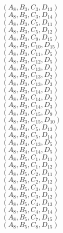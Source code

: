 \documentclass[14pt]{article}
\begin{document}
    $({A}_{8}, {B}_{3}, {C}_{3}, {D}_{13}) $ \\ 
    $({A}_{8}, {B}_{3}, {C}_{3}, {D}_{14}) $ \\ 
    $({A}_{8}, {B}_{3}, {C}_{5}, {D}_{11}) $ \\ 
    $({A}_{8}, {B}_{3}, {C}_{5}, {D}_{12}) $ \\ 
    $({A}_{8}, {B}_{3}, {C}_{9}, {D}_{15}) $ \\ 
    $({A}_{8}, {B}_{3}, {C}_{10}, {D}_{15}) $ \\ 
    $({A}_{8}, {B}_{3}, {C}_{11}, {D}_{5}) $ \\ 
    $({A}_{8}, {B}_{3}, {C}_{12}, {D}_{5}) $ \\ 
    $({A}_{8}, {B}_{3}, {C}_{13}, {D}_{1}) $ \\ 
    $({A}_{8}, {B}_{3}, {C}_{13}, {D}_{2}) $ \\ 
    $({A}_{8}, {B}_{3}, {C}_{13}, {D}_{3}) $ \\ 
    $({A}_{8}, {B}_{3}, {C}_{14}, {D}_{1}) $ \\ 
    $({A}_{8}, {B}_{3}, {C}_{14}, {D}_{2}) $ \\ 
    $({A}_{8}, {B}_{3}, {C}_{14}, {D}_{3}) $ \\ 
    $({A}_{8}, {B}_{3}, {C}_{15}, {D}_{9}) $ \\ 
    $({A}_{8}, {B}_{3}, {C}_{15}, {D}_{10}) $ \\ 
    $({A}_{8}, {B}_{4}, {C}_{5}, {D}_{13}) $ \\ 
    $({A}_{8}, {B}_{4}, {C}_{5}, {D}_{14}) $ \\ 
    $({A}_{8}, {B}_{4}, {C}_{13}, {D}_{5}) $ \\ 
    $({A}_{8}, {B}_{4}, {C}_{14}, {D}_{5}) $ \\ 
    $({A}_{8}, {B}_{5}, {C}_{1}, {D}_{11}) $ \\ 
    $({A}_{8}, {B}_{5}, {C}_{1}, {D}_{12}) $ \\ 
    $({A}_{8}, {B}_{5}, {C}_{2}, {D}_{11}) $ \\ 
    $({A}_{8}, {B}_{5}, {C}_{2}, {D}_{12}) $ \\ 
    $({A}_{8}, {B}_{5}, {C}_{3}, {D}_{11}) $ \\ 
    $({A}_{8}, {B}_{5}, {C}_{3}, {D}_{12}) $ \\ 
    $({A}_{8}, {B}_{5}, {C}_{4}, {D}_{13}) $ \\ 
    $({A}_{8}, {B}_{5}, {C}_{4}, {D}_{14}) $ \\ 
    $({A}_{8}, {B}_{5}, {C}_{7}, {D}_{15}) $ \\ 
    $({A}_{8}, {B}_{5}, {C}_{8}, {D}_{15}) $ \\ 
\end{document}
